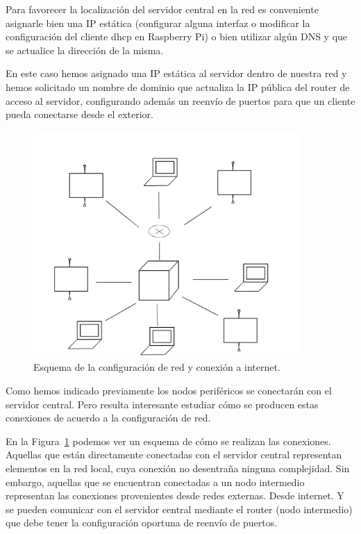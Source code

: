 \documentclass[a4paper,10pt]{article}
\begin{document}
Para favorecer la localización del servidor central en la red es
conveniente asignarle bien una IP estática (configurar alguna interfaz
o modificar la configuración del cliente dhcp en Raspberry Pi) o bien
utilizar algún DNS y que se actualice la dirección de la misma.

En este caso hemos asignado una IP estática al servidor dentro de
nuestra red y hemos solicitado un nombre de dominio que actualiza la
IP pública del router de acceso al servidor, configurando además un
reenvío de puertos para que un cliente pueda conectarse desde el exterior.


\begin{figure}[H]
  \centering
  \includegraphics[width=0.9\textwidth]{img/esquema_estrella_internet.png}
  \caption{Esquema de la configuración de red y conexión a internet.}\label{fig:esquema-estrella-internet}
\end{figure}


Como hemos indicado previamente los nodos periféricos se conectarán
con el servidor central. Pero resulta interesante estudiar cómo se
producen estas conexiones de acuerdo a la configuración de red.

En la Figura~\ref{fig:esquema-estrella-internet} podemos ver un
esquema de cómo se realizan las conexiones. Aquellas que están
directamente conectadas con el servidor central representan elementos
en la red local, cuya conexión no desentraña ninguna complejidad. Sin
embargo, aquellas que se encuentran conectadas a un nodo intermedio
representan las conexiones provenientes desde redes externas. Desde
internet. Y se pueden comunicar con el servidor central mediante el
router (nodo intermedio) que debe tener la configuración oportuna de
reenvío de puertos.
\end{document}
